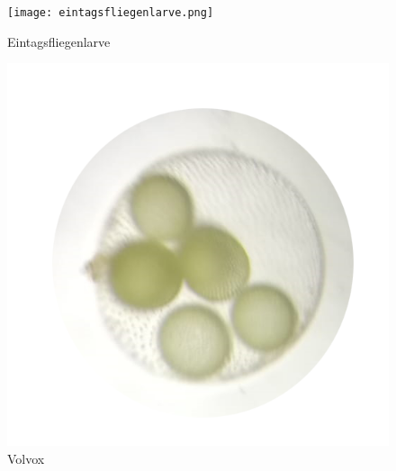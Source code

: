 \documentclass{article}
\begin{document}
            \begin{figure}[h!]
            \centering
            \texttt{[image: eintagsfliegenlarve.png]}
            \caption{Eintagsfliegenlarve}
            \label{fig:universe}
            \end{figure}
            
            \begin{figure}[h!]
            \centering
            \includegraphics[scale=0.55]{volvox.png}
            \caption{Volvox}
            \label{fig:universe}
            \end{figure}
        
            \newpage
        
\end{document}
